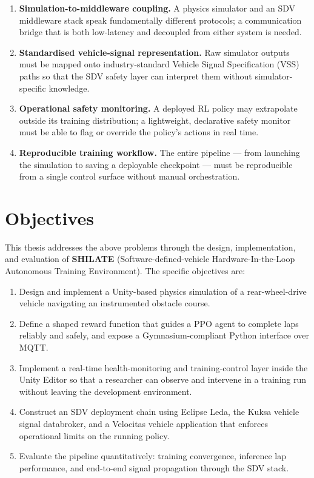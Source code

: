 \begin{enumerate}[leftmargin=2cm,topsep=1.15pt,itemsep=1.15pt,partopsep=1.15pt,parsep=1.15pt]
  \item \textbf{Simulation-to-middleware coupling.} A physics simulator and an
    SDV middleware stack speak fundamentally different protocols; a
    communication bridge that is both low-latency and decoupled from either
    system is needed.
  \item \textbf{Standardised vehicle-signal representation.} Raw simulator
    outputs must be mapped onto industry-standard Vehicle Signal Specification
    (VSS) paths so that the SDV safety layer can interpret them without
    simulator-specific knowledge.
  \item \textbf{Operational safety monitoring.} A deployed RL policy may
    extrapolate outside its training distribution; a lightweight, declarative
    safety monitor must be able to flag or override the policy's actions in
    real time.
  \item \textbf{Reproducible training workflow.} The entire pipeline --- from
    launching the simulation to saving a deployable checkpoint --- must be
    reproducible from a single control surface without manual orchestration.
\end{enumerate}

\section{Objectives}
\label{sec:objectives}

This thesis addresses the above problems through the design, implementation, and
evaluation of \textbf{SHILATE} (Software-defined-vehicle Hardware-In-the-Loop
Autonomous Training Environment). The specific objectives are:

\begin{enumerate}[leftmargin=2cm,topsep=1.15pt,itemsep=1.15pt,partopsep=1.15pt,parsep=1.15pt]
  \item Design and implement a Unity-based physics simulation of a rear-wheel-drive
    vehicle navigating an instrumented obstacle course.
  \item Define a shaped reward function that guides a PPO agent to complete laps
    reliably and safely, and expose a Gymnasium-compliant Python interface over MQTT.
  \item Implement a real-time health-monitoring and training-control layer inside
    the Unity Editor so that a researcher can observe and intervene in a training
    run without leaving the development environment.
  \item Construct an SDV deployment chain using Eclipse Leda, the Kuksa vehicle
    signal databroker, and a Velocitas vehicle application that enforces
    operational limits on the running policy.
  \item Evaluate the pipeline quantitatively: training convergence, inference
    lap performance, and end-to-end signal propagation through the SDV stack.
\end{enumerate}

